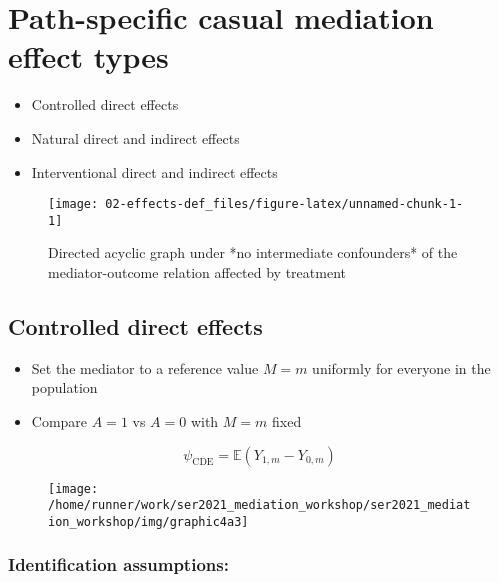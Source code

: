 \documentclass[
  12pt,
]{book}
\providecommand{\tightlist}{%
  \setlength{\itemsep}{0pt}\setlength{\parskip}{0pt}}
\theoremstyle{definition}
\theoremstyle{definition}
\theoremstyle{definition}
\newcommand{\E}{\mathbb{E}}
\newcommand{\1}{\mathbbm{1}}
\begin{document}
\hypertarget{estimands}{%
\chapter{Path-specific casual mediation effect types}\label{estimands}}

\begin{itemize}
\tightlist
\item
  Controlled direct effects
\item
  Natural direct and indirect effects
\item
  Interventional direct and indirect effects
\end{itemize}

\begin{figure}

{\centering \texttt{[image: 02-effects-def\_files/figure-latex/unnamed-chunk-1-1]} 

}

\caption{Directed acyclic graph under *no intermediate confounders* of the mediator-outcome relation affected by treatment}\label{fig:unnamed-chunk-1}
\end{figure}

\hypertarget{controlled-direct-effects}{%
\section{Controlled direct effects}\label{controlled-direct-effects}}

\begin{itemize}
\tightlist
\item
  Set the mediator to a reference value \(M=m\) uniformly for everyone in the
  population
\item
  Compare \(A=1\) vs \(A=0\) with \(M=m\) fixed
\end{itemize}

\[\psi_{\text{CDE}} = \E(Y_{1,m} - Y_{0,m}) \]

\begin{figure}

{\centering \texttt{[image: /home/runner/work/ser2021\_mediation\_workshop/ser2021\_mediation\_workshop/img/graphic4a3]} 

}

\end{figure}

\hypertarget{identification-assumptions}{%
\subsection{Identification assumptions:}\label{identification-assumptions}}
\end{document}
